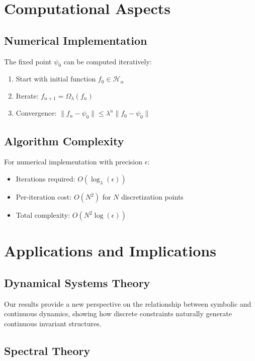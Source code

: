 \documentclass[12pt]{article}
\theoremstyle{plain}
\theoremstyle{definition}
\begin{document}
\section{Computational Aspects}

\subsection{Numerical Implementation}

The fixed point $\psi_0$ can be computed iteratively:
\begin{enumerate}
\item Start with initial function $f_0 \in \mathcal{H}_\alpha$
\item Iterate: $f_{n+1} = \Omega_\lambda(f_n)$
\item Convergence: $\|f_n - \psi_0\| \leq \lambda^n \|f_0 - \psi_0\|$
\end{enumerate}

\subsection{Algorithm Complexity}

For numerical implementation with precision $\epsilon$:
\begin{itemize}
\item Iterations required: $O(\log_\lambda(\epsilon))$
\item Per-iteration cost: $O(N^2)$ for $N$ discretization points
\item Total complexity: $O(N^2 \log(\epsilon))$
\end{itemize}

\section{Applications and Implications}

\subsection{Dynamical Systems Theory}

Our results provide a new perspective on the relationship between symbolic and continuous dynamics, showing how discrete constraints naturally generate continuous invariant structures.

\subsection{Spectral Theory}
\end{document}
